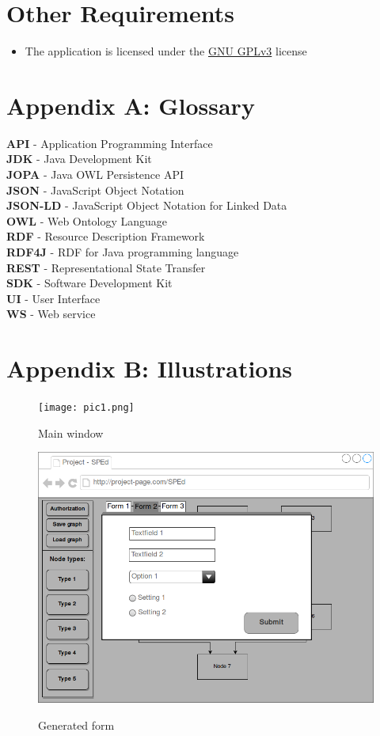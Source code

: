 \documentclass{article}
\begin{document}
	\section{Other Requirements}
	\begin{itemize}
	    \item The application is licensed under the \href{https://www.gnu.org/licenses/gpl.txt}{GNU GPLv3} license
	\end{itemize}
	\section*{Appendix A: Glossary}
	\textbf{API} - Application Programming Interface\\
	\textbf{JDK} - Java Development Kit\\
	\textbf{JOPA} - Java OWL Persistence API\\
	\textbf{JSON} - JavaScript Object Notation\\
	\textbf{JSON-LD} - JavaScript Object Notation for Linked Data\\
	\textbf{OWL} - Web Ontology Language\\
	\textbf{RDF} - Resource Description Framework\\
	\textbf{RDF4J} - RDF for Java programming language\\
	\textbf{REST} - Representational State Transfer\\
	\textbf{SDK} - Software Development Kit\\
	\textbf{UI} - User Interface\\
	\textbf{WS} - Web service
	\newpage
	\section*{Appendix B: Illustrations}
	\begin{figure}[h!]
	    \texttt{[image: pic1.png]}
	    \label{pic1}
	    \caption{Main window}
	\end{figure}
	\begin{figure}[h!]
	    \includegraphics[width=\textwidth]{pic2.png}
	    \label{pic2}
	    \caption{Generated form}
	\end{figure}
\end{document}
